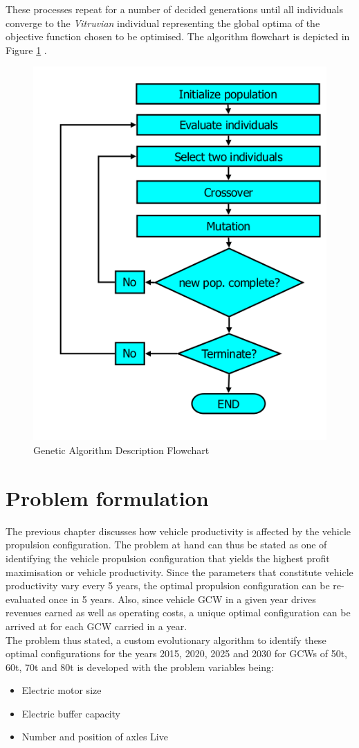 \documentclass[ExampleMasters.tex]{subfiles}
\begin{document}
		These processes repeat for a number of decided generations until all individuals converge to the \textit{Vitruvian} individual representing the global optima of the objective function chosen to be optimised. The algorithm flowchart is depicted in Figure \ref{GAFlowchart} \cite{Wahde}.\\

		\begin{figure}[ht!]
			\centering
			\includegraphics[width=0.5\linewidth]{figures/GeneticAlgorithm/GAFlowchart.png}
			\caption{Genetic Algorithm Description Flowchart \cite{Wahde}}
			\label{GAFlowchart}
		\end{figure}

	\section{Problem formulation}
		The previous chapter discusses how vehicle productivity is affected by the vehicle propulsion configuration. The problem at hand can thus be stated as one of identifying the vehicle propulsion configuration that yields the highest profit maximisation or vehicle productivity. Since the parameters that constitute vehicle productivity vary every 5 years, the optimal propulsion configuration can be re-evaluated once in 5 years. Also, since vehicle GCW in a given year drives revenues earned as well as operating costs, a unique optimal configuration can be arrived at for each GCW carried in a year.\\ 

		The problem thus stated, a custom evolutionary algorithm to identify these optimal configurations for the years 2015, 2020, 2025 and 2030 for GCWs of 50t, 60t, 70t and 80t is developed with the problem variables being:
		\begin{itemize}
			\item Electric motor size
			\item Electric buffer capacity
			\item Number and position of axles Live
		\end{itemize}
\end{document}
